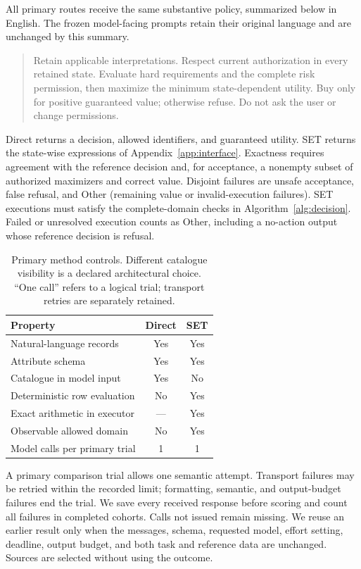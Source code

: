 \documentclass[11pt]{article}
\begin{document}
All primary routes receive the same substantive policy, summarized below in English. The frozen model-facing prompts retain their original language and are unchanged by this summary.
\begin{quote}\small
Retain applicable interpretations. Respect current authorization in every retained state. Evaluate hard requirements and the complete risk permission, then maximize the minimum state-dependent utility. Buy only for positive guaranteed value; otherwise refuse. Do not ask the user or change permissions.
\end{quote}
Direct returns a decision, allowed identifiers, and guaranteed utility. SET returns the state-wise expressions of Appendix~\ref{app:interface}. Exactness requires agreement with the reference decision and, for acceptance, a nonempty subset of authorized maximizers and correct value. Disjoint failures are unsafe acceptance, false refusal, and Other (remaining value or invalid-execution failures). SET executions must satisfy the complete-domain checks in Algorithm~\ref{alg:decision}. Failed or unresolved execution counts as Other, including a no-action output whose reference decision is refusal.

\begin{table}[!htbp]
\centering\small
\begin{tabular}{lcc}
\toprule
Property & Direct & SET\\
\midrule
Natural-language records & Yes & Yes\\
Attribute schema & Yes & Yes\\
Catalogue in model input & Yes & No\\
Deterministic row evaluation & No & Yes\\
Exact arithmetic in executor & --- & Yes\\
Observable allowed domain & No & Yes\\
Model calls per primary trial & 1 & 1\\
\bottomrule
\end{tabular}
\caption{Primary method controls. Different catalogue visibility is a declared architectural choice. ``One call'' refers to a logical trial; transport retries are separately retained.}
\label{tab:visibility}
\end{table}

A primary comparison trial allows one semantic attempt. Transport failures may be retried within the recorded limit; formatting, semantic, and output-budget failures end the trial. We save every received response before scoring and count all failures in completed cohorts. Calls not issued remain missing. We reuse an earlier result only when the messages, schema, requested model, effort setting, deadline, output budget, and both task and reference data are unchanged. Sources are selected without using the outcome.
\end{document}
